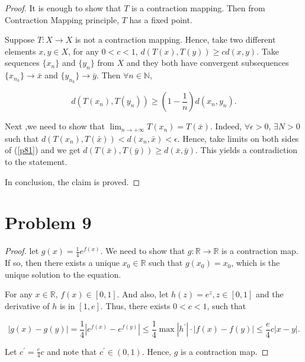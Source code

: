 \documentclass[12pt]{article}
\begin{document}
\begin{proof}

It is enough to show that $T$ is a contraction mapping. Then from Contraction Mapping principle, $T$ has a fixed point.

Suppose $T: X \rightarrow X$ is not a contraction mapping. Hence, take two different elements $x, y\in X$, for any $0<c<1$, $d(T(x), T(y)) \geqslant c d(x, y)$. Take sequences $\{x_n\}$ and $\{y_n\}$ from $X$ and they both have convergent subsequences $\{x_{n_k}\} \rightarrow \bar x$ and $\{y_{n_k}\} \rightarrow \bar y$. Then $\forall n \in \mathbb N$, 


\begin{equation}\label{p81}
d(T(x_n), T(y_n)) \geqslant (1-\frac{1}{n}) d(x_n, y_n).
\end{equation}

Next ,we need to show that $\lim_{n\rightarrow +\infty} T(x_n) = T(\bar x)$. Indeed, $\forall \epsilon >0$, $\exists N>0$ such that $d(T(x_n), T(\bar x)) < d(x_n, \bar x) < \epsilon$. Hence, take limits on both sides of (\ref{p81}) and we get $d(T(\bar x), T(\bar y)) \geqslant d(\bar x, \bar y)$. This yields a contradiction to the statement.

In conclusion, the claim is proved.

\end{proof}

\vspace{60mm}


\section*{Problem 9}

\begin{proof}

let $g(x) = \frac{1}{4} e^{f(x)}$. We need to show that $g: \mathbb{R} \rightarrow \mathbb{R}$ is a contraction map. If so, then there exists a unique $x_0\in\mathbb{R}$ such that $g(x_0) = x_0$, which is the unique solution to the equation.

For any $x\in \mathbb{R}$, $f(x) \in [0, 1]$. And also, let $h(z) = e^z, z\in [0, 1]$ and the derivative of $h$ is in $[1, e]$. Thus, there exists $0<c<1$, such that

$$
|g(x) - g(y)| = \frac{1}{4}|e^{f(x)} - e^{f(y)}| \leqslant \frac{1}{4}\max |h^\prime|\cdot |f(x) - f(y)| \leqslant \frac{e}{4}c|x-y|.
$$

Let $c^\prime = \frac{e}{4}c$ and note that $c^\prime \in (0, 1)$. Hence, $g$ is a contraction map.


\end{proof}
\end{document}
